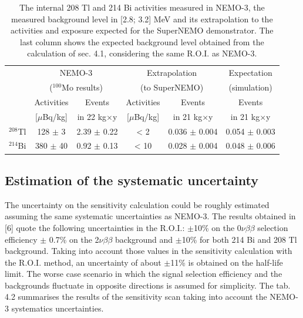 \documentclass[main.tex]{subfiles}
\begin{document}
\begin{table}
\centering
\begin{tabular}{c|cc|cc|c}
                  & \multicolumn{2}{c|}{NEMO-3}                      & \multicolumn{2}{c|}{Extrapolation} & Expectation \\
                  & \multicolumn{2}{c|}{($^{\text{100}}$Mo results)} & \multicolumn{2}{c|}{(to SuperNEMO)} & (simulation) \\[0.1cm]
\toprule
                  & Activities   & Events           & Activities  & Events            & Events \\  
                  & [$\mu$Bq/kg] & in 22 kg$\times$y& [$\mu$Bq/kg] &in 21 kg$\times$y  & in 21 kg$\times$y\\  [0.1cm]
\hline
$^{\text{208}}$Tl & 128 $\pm$ 3  & 2.39 $\pm$ 0.22 & < 2        & 0.036 $\pm$ 0.004 & 0.054 $\pm$ 0.003 \\
$^{\text{214}}$Bi & 380 $\pm$ 40 & 0.92 $\pm$ 0.13 & < 10       & 0.028 $\pm$ 0.004 & 0.048 $\pm$ 0.006 \\
\bottomrule
\end{tabular}
\caption{The internal 208 Tl and 214 Bi activities measured in NEMO-3, the measured background level in [2.8; 3.2] MeV and its extrapolation to the activities and exposure expected for the SuperNEMO demonstrator. The last column shows the expected background level obtained from the calculation of sec. 4.1, considering the same R.O.I. as NEMO-3.}
\label{Tab:Extrapolation}
\end{table}


\subsection{Estimation of the systematic uncertainty}


\NI The uncertainty on the sensitivity calculation could be roughly estimated assuming the same systematic uncertainties as NEMO-3. The results obtained in [6] quote the following uncertainties in the R.O.I.: $\pm$10\% on the 0$\nu\beta\beta$ selection efficiency $\pm$ 0.7\% on the 2$\nu\beta\beta$ background and $\pm$10\% for both 214 Bi and 208 Tl background. Taking into account those values in the sensitivity calculation with the R.O.I. method, an uncertainty of about $\pm$11\% is obtained on the half-life limit. The worse case scenario in which the signal selection efficiency and the backgrounds fluctuate in opposite directions is assumed for simplicity. The tab. 4.2 summarises the results of the sensitivity scan taking into account the NEMO-3 systematics uncertainties.
\end{document}
